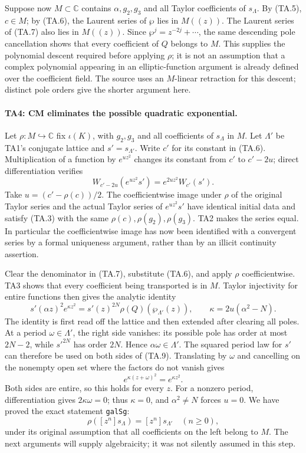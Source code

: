 Suppose now $M\subset\mathbb C$ contains $\alpha,g_2,g_3$ and
all Taylor coefficients of $s_\Lambda$. By (TA.5), $c\in M$;
by (TA.6), the Laurent series of $\wp$ lies in $M((z))$.
The Laurent series of (TA.7) also lies in $M((z))$. Since
$\wp^j=z^{-2j}+\cdots$, the same descending pole cancellation
shows that every coefficient of $Q$ belongs to $M$.
This supplies the polynomial descent required before applying
$\rho$; it is not an assumption that a complex polynomial
appearing in an elliptic-function argument is already defined
over the coefficient field. The source uses an $M$-linear
retraction for this descent; distinct pole orders give the
shorter argument here.

\paragraph{TA4: CM eliminates the possible quadratic exponential.}
Let $\rho:M\hookrightarrow\mathbb C$ fix $\iota(K)$, with
$g_2,g_3$ and all coefficients of $s_\Lambda$ in $M$.
Let $\Lambda'$ be TA1's conjugate lattice and $s'=s_{\Lambda'}$.
Write $c'$ for its constant in (TA.6). Multiplication of a
function by $e^{uz^2}$ changes its constant from $c'$ to
$c'-2u$; direct differentiation verifies
\[
 W_{c'-2u}(e^{uz^2}s')=e^{2uz^2}W_{c'}(s').                  \tag{TA.8}
\]
Take $u=(c'-\rho(c))/2$. The coefficientwise image under $\rho$
of the original Taylor series and the actual Taylor series of
$e^{uz^2}s'$ have identical initial data and satisfy (TA.3) with
the same $\rho(c),\rho(g_2),\rho(g_3)$. TA2 makes the series
equal. In particular the coefficientwise image has now been
identified with a convergent series by a formal uniqueness
argument, rather than by an illicit continuity assertion.

Clear the denominator in (TA.7), substitute (TA.6), and apply
$\rho$ coefficientwise. TA3 shows that every coefficient being
transported is in $M$. Taylor injectivity for entire functions
then gives the analytic identity
\[
 s'(\alpha z)^2e^{\kappa z^2}
       =s'(z)^{2N}\rho(Q)(\wp_{\Lambda'}(z)),\qquad
             \kappa=2u(\alpha^2-N).                          \tag{TA.9}
\]
The identity is first read off the lattice and then extended
after clearing all poles. At a period $\omega\in\Lambda'$,
the right side vanishes: its possible pole has order at most
$2N-2$, while $s'^{2N}$ has order $2N$. Hence
$\alpha\omega\in\Lambda'$. The squared period law for $s'$
can therefore be used on both sides of (TA.9). Translating by
$\omega$ and cancelling on the nonempty open set where the
factors do not vanish gives
\[
                  e^{\kappa(z+\omega)^2}=e^{\kappa z^2}.
\]
Both sides are entire, so this holds for every $z$. For a
nonzero period, differentiation gives $2\kappa\omega=0$;
thus $\kappa=0$, and $\alpha^2\ne N$ forces $u=0$.
We have proved the exact statement \texttt{galSg}:
\[
 \rho([z^n]s_\Lambda)=[z^n]s_{\Lambda'}\quad(n\ge0),          \tag{TA.10}
\]
under its original assumption that all coefficients on the
left belong to $M$. The next arguments will supply algebraicity;
it was not silently assumed in this step.

